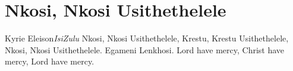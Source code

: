 \starttocol
\chapter{Nkosi, Nkosi Usithethelele}
\nexttocol
K{\sc yrie Eleison}\hfill{\it IsiZulu}
\stoptocol
\starttocol
\startlines
N{\sc kosi}, Nkosi   Usithethelele,
Krestu, Krestu Usithethelele,
Nkosi,  Nkosi  Usithethelele.
Egameni Lenkhosi.
\stoplines
\nexttocol
\startlines
Lord have mercy,
Christ have mercy,
Lord have mercy.
\stoplines
\stoptocol
